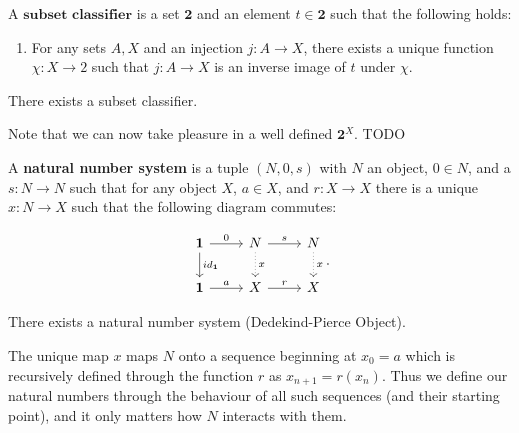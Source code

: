 \begin{definition}
A $\textbf{subset classifier}$ is a set $\mathbf{2}$ and an element $t \in \mathbf{2}$ such that the following holds:
\begin{enumerate}
\item For any sets $A,X$ and an injection $j: A \longrightarrow X$, there exists a unique function $\chi: X \longrightarrow 2$ such that $j: A \longrightarrow X$ is an inverse image of $t$ under $\chi$.
\end{enumerate}

\end{definition}

\begin{axiom}[Subsets]
There exists a subset classifier.
\end{axiom}

\begin{remark}
Note that we can now take pleasure in a well defined $\mathbf{2}^X$. TODO
\end{remark}

\begin{definition}
A \textbf{natural number system} is a tuple $(N,0,s)$ with $N$ an object, $0 \in N$, and a $s: N \longrightarrow N$ such that for any object $X$, $a \in X$, and $r: X \longrightarrow X$
there is a unique $x: N \longrightarrow X$ such that the following diagram commutes:

\begin{equation*}
\begin{tikzcd}
\mathbf{1} \arrow[r, "0"] \arrow[d, "id_\mathbf{1}"]
& N \arrow[r, "s"] \arrow[d, "x", dotted]
& N \arrow[d, "x", dotted]   \\
\mathbf{1} \arrow[r, "a"]
& X \arrow[r, "r"]
& X
\end{tikzcd}.
\end{equation*}

\end{definition}

\begin{axiom}
There exists a natural number system (Dedekind-Pierce Object).
\end{axiom}

\begin{remark}
The unique map $x$ maps $N$ onto a sequence beginning at $x_0 = a$ which is recursively defined through the function $r$ as $x_{n+1} = r(x_n)$. Thus we define our natural numbers through the behaviour of all such sequences (and their starting point), and it only matters how $N$ interacts with them.
\end{remark}

